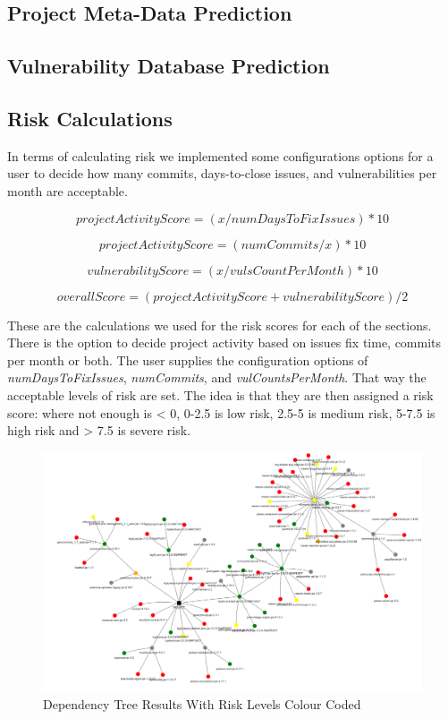 \documentclass[10pt, onecolumn, compsoc, conference]{IEEEtran}
\begin{document}
\subsection{Project Meta-Data Prediction}

\subsection{Vulnerability Database Prediction}

\subsection{Risk Calculations}
In terms of calculating risk we implemented some configurations options for a user to decide how many commits, days-to-close issues, and vulnerabilities per month are acceptable. 

\[ projectActivityScore = ( x / numDaysToFixIssues ) * 10\]

\[ projectActivityScore = ( numCommits / x ) * 10\]

\[vulnerabilityScore = ( x / vulsCountPerMonth ) * 10\]

\[overallScore = ( projectActivityScore + vulnerabilityScore) / 2\]


These are the calculations we used for the risk scores for each of the sections. There is the option to decide project activity based on issues fix time, commits per month or both. The user supplies the configuration options of \textit{numDaysToFixIssues}, \textit{numCommits}, and \textit{vulCountsPerMonth}. That way the acceptable levels of risk are set. The idea is that they are then assigned a risk score: where not enough is < 0, 0-2.5 is low risk, 2.5-5 is medium risk, 5-7.5 is high risk and > 7.5 is severe risk. 

\begin{figure}
    \centering
    \includegraphics[width=01\linewidth]{image.png}
    \caption{Dependency Tree Results With Risk Levels Colour Coded} 
\end{figure}
\end{document}
